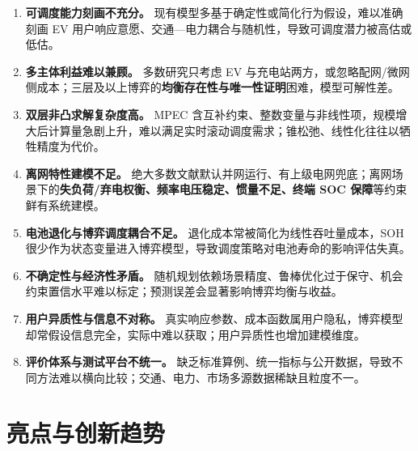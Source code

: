 \documentclass[UTF8,a4paper,11pt]{ctexart}
\begin{document}
\begin{enumerate}
  \item \textbf{可调度能力刻画不充分。} 现有模型多基于确定性或简化行为假设，难以准确刻画 EV 用户响应意愿、交通—电力耦合与随机性，导致可调度潜力被高估或低估\cite{ref1,ref2}。
  \item \textbf{多主体利益难以兼顾。} 多数研究只考虑 EV 与充电站两方，或忽略配网/微网侧成本；三层及以上博弈的\textbf{均衡存在性与唯一性证明}困难，模型可解性差\cite{ref1,ref3}。
  \item \textbf{双层非凸求解复杂度高。} MPEC 含互补约束、整数变量与非线性项，规模增大后计算量急剧上升，难以满足实时滚动调度需求；锥松弛、线性化往往以牺牲精度为代价\cite{ref4}。
  \item \textbf{离网特性建模不足。} 绝大多数文献默认并网运行、有上级电网兜底；离网场景下的\textbf{失负荷/弃电权衡、频率电压稳定、惯量不足、终端 SOC 保障}等约束鲜有系统建模。
  \item \textbf{电池退化与博弈调度耦合不足。} 退化成本常被简化为线性吞吐量成本，SOH 很少作为状态变量进入博弈模型，导致调度策略对电池寿命的影响评估失真\cite{ref8,ref13}。
  \item \textbf{不确定性与经济性矛盾。} 随机规划依赖场景精度、鲁棒优化过于保守、机会约束置信水平难以标定；预测误差会显著影响博弈均衡与收益\cite{ref7}。
  \item \textbf{用户异质性与信息不对称。} 真实响应参数、成本函数属用户隐私，博弈模型却常假设信息完全，实际中难以获取；用户异质性也增加建模维度\cite{ref16}。
  \item \textbf{评价体系与测试平台不统一。} 缺乏标准算例、统一指标与公开数据，导致不同方法难以横向比较；交通、电力、市场多源数据稀缺且粒度不一。
\end{enumerate}

\section{亮点与创新趋势}
\end{document}
